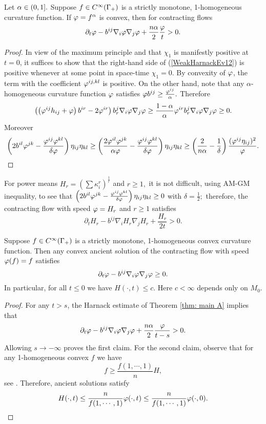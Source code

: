 \documentclass{amsart}
\begin{document}
\begin{theorem}\label{thm: main A}
Let $\alpha\in(0,1].$ Suppose $f\in C^{\infty}(\Gamma_+)$ is a strictly monotone, 1-homogeneous curvature function. If $\varphi=f^{\alpha}$ is convex, then for contracting flows
$$\partial_t \varphi-b^{ij}\nabla_i\varphi\nabla_j\varphi+\frac{n\alpha}{2}\frac{\varphi}{t}>0.$$
\end{theorem}
\begin{proof}
In view of the maximum principle and that $\chi_1$ is manifestly positive at $t=0$, it suffices to show that the right-hand side of (\ref{WeakHarnackEv12}) is positive whenever at some point in space-time $\chi_1=0$. By convexity of $\varphi$, the term with the coefficient $\varphi^{ij,kl}$ is positive. On the other hand, note that any $\alpha$-homogeneous curvature function $\varphi$ satisfies $\varphi b^{ij}\geq \frac{\varphi^{ij}}{\alpha}.$ Therefore
$$\left(\left(\varphi^{ij}h_{ij}+\varphi\right)b^{ir}-2\varphi^{ir}\right)b^{j}_{r}\nabla_{i}\varphi\nabla_{j}\varphi\ge \frac{1-\alpha}{\alpha}\varphi^{ir}b^{j}_{r}\nabla_{i}\varphi\nabla_{j}\varphi\ge 0.$$ Moreover
$$\left(2b^{il}\varphi^{jk}-\frac{\varphi^{ij}\varphi^{kl}}{\delta\varphi}\right)\eta_{ij}\eta_{kl}\geq \left(\frac{2\varphi^{il}\varphi^{jk}}{\alpha\varphi}-\frac{\varphi^{ij}\varphi^{kl}}{\delta\varphi}\right)\eta_{ij}\eta_{kl}\geq \left(\frac{2}{n\alpha}-\frac{1}{\delta}\right)\frac{(\varphi^{ij}\eta_{ij})^2}{\varphi}.$$
\end{proof}
\begin{remark}
For power means $H_r=\left(\sum \kappa_i^r\right)^{\frac{1}{r}}$ and $r\geq 1,$ it is not difficult, using AM-GM inequality, to see that $\left(2b^{il}\varphi^{jk}-\frac{\varphi^{ij}\varphi^{kl}}{\delta\varphi}\right)\eta_{ij}\eta_{kl}\geq0$ with $\delta=\frac{1}{2};$ therefore, the contracting flow with speed $\varphi=H_r$ and $r\geq 1$ satisfies
$$\partial_t H_r-b^{ij}\nabla_iH_r\nabla_jH_r+\frac{H_r}{2t}>0.$$
\end{remark}
\begin{corollary}
\label{cor:boundedH}
Suppose $f\in C^{\infty}(\Gamma_+)$ is a strictly monotone, 1-homogeneous convex curvature function. Then any convex ancient solution of the contracting flow with speed $\varphi(f)=f$ satisfies
\[\partial_t \varphi-b^{ij}\nabla_i\varphi\nabla_j\varphi\geq 0.\]
In particular, for all $t\le 0$ we have
$H(\cdot,t)\leq c.$
Here $c<\infty$ depends only on $M_0.$
\end{corollary}
\begin{proof}
For any $t>s$, the  Harnack estimate of Theorem \ref{thm: main A} implies that
$$\partial_t \varphi-b^{ij}\nabla_i\varphi\nabla_j\varphi+\frac{n\alpha}{2}\frac{\varphi}{t-s}>0.$$
Allowing $s\to-\infty$ proves the first claim. For the second claim, observe that for any 1-homogeneous convex $f$ we have \[f\ge \frac{f(1,\cdots,1)}{n}H,\]
see \cite[Chapter 2]{Gerhardt:/2006}. Therefore, ancient solutions satisfy
\[H(\cdot,t)\leq \frac{n}{f(1,\cdots,1)}\varphi(\cdot,t)\leq \frac{n}{f(1,\cdots,1)}\varphi(\cdot,0). \]
\end{proof}
\end{document}

